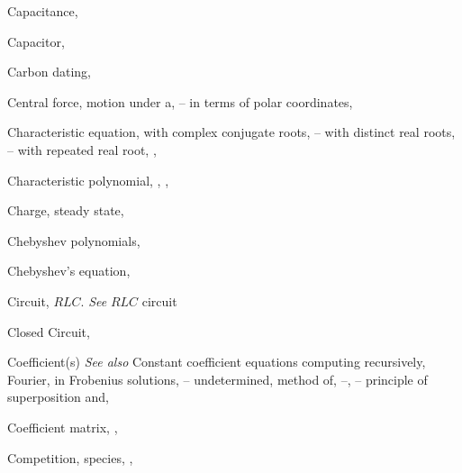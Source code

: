 \begin{theindex}
  \item Capacitance, \pageref{eq:6.3.4}

  \item Capacitor, \pageref{eq:6.3.4}

  \item Carbon dating, \pageref{example:4.1.5}

  \item Central force,
    \subitem motion under a, \pageref{exer:6.3.17}--\pageref{exer:6.4.6}
    \subitem in terms of polar coordinates,

  \item Characteristic equation, \pageref{eq:5.2.3}
    \subitem with complex conjugate roots, \pageref{example:5.2.3}--\pageref{thmtype:5.2.1}
    \subitem with distinct real roots, \pageref{example:5.2.1}--\pageref{thmtype:5.2.1}
    \subitem with repeated real root, \pageref{example:5.2.2}, \pageref{thmtype:5.2.1}

  \item Characteristic polynomial, \pageref{eq:5.2.2}, \pageref{exer:7.3.30}, \pageref{eq:9.2.2}

  \item Charge, \pageref{eq:6.3.3}
    \subitem steady state, \pageref{eq:6.3.17}

  \item Chebyshev polynomials, \pageref{eq:7.2.16}

  \item Chebyshev's equation, \pageref{eq:7.2.16}

  \item Circuit, $RLC$. \emph{See} $RLC$ circuit

  \item Closed Circuit, \pageref{exer:6.2.26}

  \item Coefficient(s) \emph{See also} Constant coefficient equations
    \subitem computing recursively, \pageref{eq:7.2.16}
    \subitem Fourier, \pageref{thmtype:11.2.2}
    \subitem in Frobenius solutions, \pageref{example:7.5.1}--\pageref{exer:7.5.26}
    \subitem undetermined, method of, \pageref{eq:5.4.1}--\pageref{exer:5.5.40}, \pageref{eq:9.2.1}--\pageref{exer:9.3.74}
      \subsubitem principle of superposition and, \pageref{example:5.4.7}

  \item Coefficient matrix, \pageref{eq:10.2.2}, \pageref{thmtype:10.2.1}

  \item Competition, species, \pageref{eq:1.1.10}, \pageref{exer:10.4.42}


\end{theindex}
